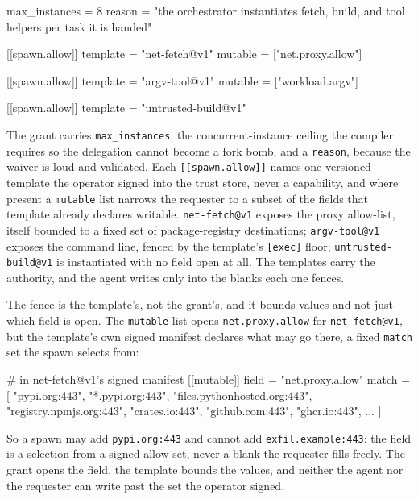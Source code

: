 \begin{kennelcode}
[spawn]
max_instances = 8
reason = "the orchestrator instantiates fetch, build, and tool helpers per task it is handed"

[[spawn.allow]]
template = "net-fetch@v1"
mutable = ["net.proxy.allow"]

[[spawn.allow]]
template = "argv-tool@v1"
mutable = ["workload.argv"]

[[spawn.allow]]
template = "untrusted-build@v1"
\end{kennelcode}

The grant carries \texttt{max\_instances}, the concurrent-instance
ceiling the compiler requires so the delegation cannot become a fork
bomb, and a \texttt{reason}, because the waiver is loud and validated.
Each \texttt{{[}{[}spawn.allow{]}{]}} names one versioned template the
operator signed into the trust store, never a capability, and where
present a \texttt{mutable} list narrows the requester to a subset of the
fields that template already declares writable. \texttt{net-fetch@v1}
exposes the proxy allow-list, itself bounded to a fixed set of
package-registry destinations; \texttt{argv-tool@v1} exposes the command
line, fenced by the template's \texttt{{[}exec{]}} floor;
\texttt{untrusted-build@v1} is instantiated with no field open at all.
The templates carry the authority, and the agent writes only into the
blanks each one fences.

The fence is the template's, not the grant's, and it bounds values and
not just which field is open. The \texttt{mutable} list opens
\texttt{net.proxy.allow} for \texttt{net-fetch@v1}, but the template's
own signed manifest declares what may go there, a fixed \texttt{match}
set the spawn selects from:

\begin{kennelcode}
# in net-fetch@v1's signed manifest
[[mutable]]
field = "net.proxy.allow"
match = [
  "pypi.org:443", "*.pypi.org:443", "files.pythonhosted.org:443",
  "registry.npmjs.org:443", "crates.io:443",
  "github.com:443", "ghcr.io:443",
  ...
]
\end{kennelcode}

So a spawn may add \texttt{pypi.org:443} and cannot add
\texttt{exfil.example:443}: the field is a selection from a signed
allow-set, never a blank the requester fills freely. The grant opens the
field, the template bounds the values, and neither the agent nor the
requester can write past the set the operator signed.

